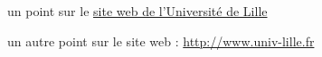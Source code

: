   \item un point sur le \href{http://www.univ-lille.fr}{site web de l'Université de Lille}
  \item un autre point sur le site web : \url{http://www.univ-lille.fr}
